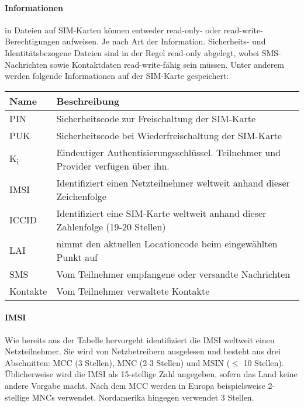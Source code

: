 \paragraph{Informationen} in Dateien auf SIM-Karten können entweder read-only- oder read-write-
Berechtigungen aufweisen. Je nach Art der Information. Sicherheits- und Identitätsbezogene
Dateien sind in der Regel read-only abgelegt, wobei SMS-Nachrichten sowie Kontaktdaten
read-write-fähig sein müssen. Unter anderem werden folgende Informationen auf der SIM-Karte gespeichert:

    \begin{tabularx}{\textwidth}{|l|X|}
    \hline
      \textbf{Name} & \textbf{Beschreibung} \\
    \hline
    \hline
      \ac{PIN} & Sicherheitscode zur Freischaltung der SIM-Karte \\
    \hline
    \hline
          \ac{PUK} & Sicherheitscode bei Wiederfreischaltung der SIM-Karte \\
    \hline
    \hline
      K\textsubscript{i} & Eindeutiger Authentisierungsschlüssel. Teilnehmer und Provider verfügen über ihn. \\
    \hline
    \hline
      \ac{IMSI} & Identifiziert einen Netzteilnehmer weltweit anhand dieser Zeichenfolge \\
    \hline
    \hline
      \ac{ICCID} & Identifiziert eine SIM-Karte weltweit anhand dieser Zahlenfolge (19-20 Stellen) \\
    \hline
    \hline
      \ac{LAI} & nimmt den aktuellen Locationcode beim eingewählten Punkt auf \\ 
    \hline
    \hline
      \ac{SMS} & Vom Teilnehmer empfangene oder versandte Nachrichten \\
    \hline
    \hline
      Kontakte & Vom Teilnehmer verwaltete Kontakte \\
    \hline
    \end{tabularx}

\paragraph{IMSI} Wie bereits aus der Tabelle hervorgeht identifiziert die \ac{IMSI} weltweit
einen Netzteilnehmer. Sie wird von Netzbetreibern ausgelesen und besteht aus drei Abschnitten:
\ac{MCC} (3 Stellen), \ac{MNC} (2-3 Stellen) und \ac{MSIN} ($\leq$ 10 Stellen).
Üblicherweise wird die \ac{IMSI} als 15-stellige Zahl angegeben, sofern das
Land keine andere Vorgabe macht. Nach dem \ac{MCC} werden in Europa beispielsweise 2-stellige \ac{MNC}s
verwendet. Nordamerika hingegen verwendet 3 Stellen. 

